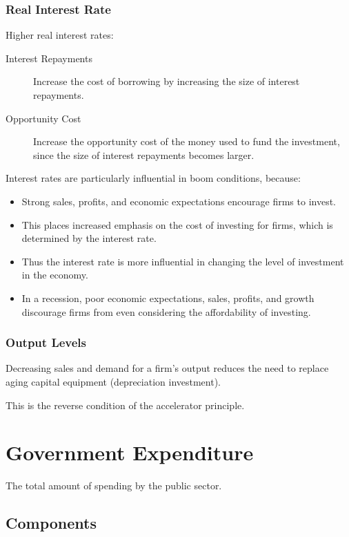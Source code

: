 \documentclass[a4paper,11pt]{article}
\begin{document}
\subsubsection{Real Interest Rate}

Higher real interest rates:

\begin{description}
\item [Interest Repayments] Increase the cost of borrowing by increasing the
	size of interest repayments.
\item [Opportunity Cost] Increase the opportunity cost of the money used to
	fund the investment, since the size of interest repayments becomes larger.
\end{description}

Interest rates are particularly influential in boom conditions, because:

\begin{itemize}
\item Strong sales, profits, and economic expectations encourage firms to
	invest.
\item This places increased emphasis on the cost of investing for firms, which
	is determined by the interest rate.
\item Thus the interest rate is more influential in changing the level of
	investment in the economy.
\item In a recession, poor economic expectations, sales, profits, and growth
	discourage firms from even considering the affordability of investing.
\end{itemize}


\subsubsection{Output Levels}

Decreasing sales and demand for a firm's output reduces the need to replace
aging capital equipment (depreciation investment).

This is the reverse condition of the accelerator principle.




\section{Government Expenditure}

The total amount of spending by the public sector.


\subsection{Components}
\end{document}
